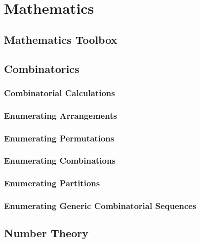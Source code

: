 \chapter{Mathematics}

\section{Mathematics Toolbox}
\setcounter{section}{1}


\section{Combinatorics}
\setcounter{section}{2}
\setcounter{subsection}{0}
\subsection{Combinatorial Calculations}

\subsection{Enumerating Arrangements}

\subsection{Enumerating Permutations}

\subsection{Enumerating Combinations}

\subsection{Enumerating Partitions}

\subsection{Enumerating Generic Combinatorial Sequences}


\section{Number Theory}
\setcounter{section}{3}
\setcounter{subsection}{0}
